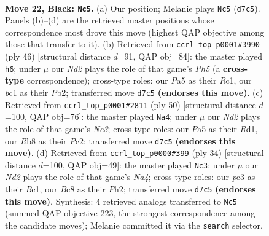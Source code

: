 \documentclass[11pt]{article}
\begin{document}
\clearpage

\begin{figure}[p]\centering
\begin{subfigure}{0.46\textwidth}\centering
\resizebox{\linewidth}{!}{%
\newchessgame
\chessboard[
  setfen={1rb1r1k1/p1pn1pp1/2n4p/p4q1P/2P2PR1/2P1P3/8/R1BQKBN1 b Q - 7 22},
  showmover=false,
  pgfstyle=straightmove, color=movearrow, markmove={d7-c5}
]}
\caption{}
\end{subfigure}\hfill
\begin{subfigure}{0.46\textwidth}\centering
\resizebox{\linewidth}{!}{%
\newchessgame
\chessboard[
  setfen={2rq1bk1/p2n1pp1/2p5/3p1Q1P/N3r1p1/2B3P1/PP2PP2/2RR2K1 w - - 1 24},
  showmover=false,
  pgfstyle=straightmove, color=movearrow, markmove={h5-h6}
]}
\caption{}
\end{subfigure}
\\[4pt]
\begin{subfigure}{0.46\textwidth}\centering
\resizebox{\linewidth}{!}{%
\newchessgame
\chessboard[
  setfen={1rbq4/4bpk1/6r1/pB1Ppp1Q/7p/1RN4P/P1P2PP1/3R2K1 w - - 0 26},
  showmover=false,
  pgfstyle=straightmove, color=movearrow, markmove={c3-a4}
]}
\caption{}
\end{subfigure}\hfill
\begin{subfigure}{0.46\textwidth}\centering
\resizebox{\linewidth}{!}{%
\newchessgame
\chessboard[
  setfen={r2qk2r/3nbppp/3pp3/1Q1b4/NP1P4/5N2/P4PPP/R1B1R1K1 w k - 3 18},
  showmover=false,
  pgfstyle=straightmove, color=movearrow, markmove={a4-c3}
]}
\caption{}
\end{subfigure}
\caption{\textbf{Move 22, Black: \texttt{Nc5}.} (a) Our position; Melanie plays \texttt{Nc5} (\texttt{d7c5}). Panels (b)--(d) are the retrieved master positions whose correspondence most drove this move (highest QAP objective among those that transfer to it). (b) Retrieved from \texttt{ccrl\_top\_p0001\#3990} (ply 46) [structural distance $d$=91, QAP obj=84]: the master played \texttt{h6}; under $\mu$ our \emph{Nd2} plays the role of that game's \emph{Ph5} (a \textbf{cross-type} correspondence); cross-type roles: our \emph{P}a5 as their \emph{R}c1, our \emph{b}c1 as their \emph{P}b2; transferred move \texttt{d7c5} \textbf{(endorses this move)}. (c) Retrieved from \texttt{ccrl\_top\_p0001\#2811} (ply 50) [structural distance $d$=100, QAP obj=76]: the master played \texttt{Na4}; under $\mu$ our \emph{Nd2} plays the role of that game's \emph{Nc3}; cross-type roles: our \emph{P}a5 as their \emph{R}d1, our \emph{R}b8 as their \emph{P}c2; transferred move \texttt{d7c5} \textbf{(endorses this move)}. (d) Retrieved from \texttt{ccrl\_top\_p0000\#399} (ply 34) [structural distance $d$=100, QAP obj=49]: the master played \texttt{Nc3}; under $\mu$ our \emph{Nd2} plays the role of that game's \emph{Na4}; cross-type roles: our \emph{p}c3 as their \emph{B}c1, our \emph{B}c8 as their \emph{P}h2; transferred move \texttt{d7c5} \textbf{(endorses this move)}. Synthesis: 4 retrieved analogs transferred to \texttt{Nc5} (summed QAP objective 223, the strongest correspondence among the candidate moves); Melanie committed it via the \texttt{search} selector.}
\label{fig:thought-m43}
\end{figure}
\end{document}
